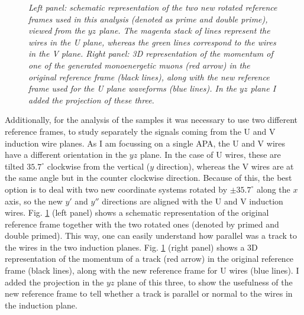 \begin{figure}[t]
\begin{subfigure}{0.5\textwidth}
	\end{subfigure}
	\caption{\textit{Left panel: schematic representation of the two new rotated reference frames used in this analysis (denoted as prime and double prime), viewed from the $yz$ plane. The magenta stack of lines represent the wires in the U plane, whereas the green lines correspond to the wires in the V plane. Right panel: 3D representation of the momentum of one of the generated monoenergetic muons (red arrow) in the original reference frame (black lines), along with the new reference frame used for the U plane waveforms (blue lines). In the $yz$ plane I added the projection of these three.}}
	\label{fig:reference_frame}
\end{figure}

Additionally, for the analysis of the samples it was necessary to use two different reference frames, to study separately the signals coming from the U and V induction wire planes. As I am focussing on a single APA, the U and V wires have a different orientation in the $yz$ plane. In the case of U wires, these are tilted $35.7^{\circ}$ clockwise from the vertical ($y$ direction), whereas the V wires are at the same angle but in the counter clockwise direction. Because of this, the best option is to deal with two new coordinate systems rotated by $\pm 35.7^{\circ}$ along the $x$ axis, so the new $y'$ and $y''$ directions are aligned with the U and V induction wires. Fig. \ref{fig:reference_frame} (left panel) shows a schematic representation of the original reference frame together with the two rotated ones (denoted by primed and double primed). This way, one can easily understand how parallel was a track to the wires in the two induction planes. Fig. \ref{fig:reference_frame} (right panel) shows a 3D representation of the momentum of a track (red arrow) in the original reference frame (black lines), along with the new reference frame for U wires (blue lines). I added the projection in the $yz$ plane of this three, to show the usefulness of the new reference frame to tell whether a track is parallel or normal to the wires in the induction plane.

